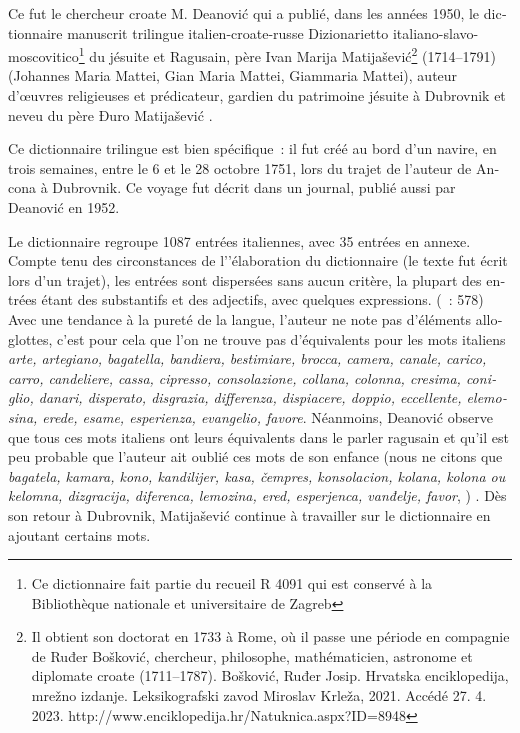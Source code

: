 \documentclass[output=paper,colorlinks,citecolor=brown,arabicfont,chinesefont,booklanguage=french]{langscibook}
\begin{document}
\begin{otherlanguage}{french}
Ce fut le chercheur croate M. Deanović qui a publié, dans les années 1950, le dictionnaire manuscrit trilingue italien-croate-russe Dizionarietto italiano-slavo- moscovitico\footnote{Ce dictionnaire fait partie du recueil R 4091 qui est conservé à la Bibliothèque nationale et universitaire de Zagreb} \citep{Deanovic1951, Deanovic1952} du jésuite et Ragusain, père Ivan Marija Matijašević\footnote{Il obtient son doctorat en 1733 à Rome, où il passe une période en compagnie de Ruđer Bošković, chercheur, philosophe, mathématicien, astronome et diplomate croate (1711--1787). Bošković, Ruđer Josip. Hrvatska enciklopedija, mrežno izdanje. Leksikografski zavod Miroslav Krleža, 2021. Accédé 27. 4. 2023. http://www.enciklopedija.hr/Natuknica.aspx?ID=8948} (1714--1791) (Johannes Maria Mattei, Gian Maria Mattei, Giammaria Mattei), auteur d’œuvres religieuses et prédicateur, gardien du patrimoine jésuite à Dubrovnik et neveu du père Đuro Matijašević \parencites[34]{Dolci1767}{Brlek1952}{Lucic1997}.

Ce dictionnaire trilingue est bien spécifique~: il fut créé au bord d'un navire, en trois semaines, entre le 6 et le 28 octobre 1751, lors du trajet de l’auteur de Ancona à Dubrovnik.  Ce voyage fut décrit dans un journal, publié aussi par Deanović en 1952.  

Le dictionnaire regroupe 1087 entrées italiennes, avec 35 entrées en annexe. Compte tenu des circonstances de l’'élaboration du dictionnaire (le texte fut écrit lors d'un trajet), les entrées sont dispersées sans aucun critère, la plupart des entrées étant des substantifs et des adjectifs, avec quelques expressions. (\citealt{Deanovic1951}~: 578) Avec une tendance à la pureté de la langue, l’auteur ne note pas d’éléments alloglottes, c’est pour cela que l’on ne trouve pas d’équivalents pour les mots italiens \emph{arte, artegiano, bagatella, bandiera, bestimiare, brocca, camera, canale, carico, carro, candeliere, cassa, cipresso, consolazione, collana, colonna, cresima, coniglio, danari, disperato, disgrazia, differenza, dispiacere, doppio, eccellente, elemosina, erede, esame, esperienza, evangelio, favore}. Néanmoins, Deanović observe que tous ces mots italiens ont leurs équivalents dans le parler ragusain et qu’il est peu probable que l’auteur ait oublié ces mots de son enfance (nous ne citons que \emph{bagatela, kamara, kono, kandilijer, kasa, čempres, konsolacion, kolana, kolona ou kelomna, dizgracija, diferenca, lemozina, ered, esperjenca, vanđelje, favor}, \citealt[581]{Deanovic1951}) . Dès son retour à Dubrovnik, Matijašević continue à travailler sur le dictionnaire en ajoutant certains mots.  


\end{otherlanguage}
\end{document}
